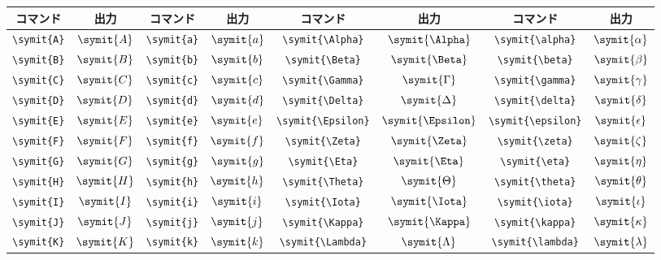 \begin{longtable}{cccccccc}
    \toprule
    コマンド         & 出力          & コマンド         & 出力          & コマンド                & 出力                 & コマンド                   & 出力                    \\
    \midrule
    \verb|\symit{A}| & \(\symit{A}\) & \verb|\symit{a}| & \(\symit{a}\) & \verb|\symit{\Alpha}|   & \(\symit{\Alpha}\)   & \verb|\symit{\alpha}|      & \(\symit{\alpha}\)      \\
    \verb|\symit{B}| & \(\symit{B}\) & \verb|\symit{b}| & \(\symit{b}\) & \verb|\symit{\Beta}|    & \(\symit{\Beta}\)    & \verb|\symit{\beta}|       & \(\symit{\beta}\)       \\
    \verb|\symit{C}| & \(\symit{C}\) & \verb|\symit{c}| & \(\symit{c}\) & \verb|\symit{\Gamma}|   & \(\symit{\Gamma}\)   & \verb|\symit{\gamma}|      & \(\symit{\gamma}\)      \\
    \verb|\symit{D}| & \(\symit{D}\) & \verb|\symit{d}| & \(\symit{d}\) & \verb|\symit{\Delta}|   & \(\symit{\Delta}\)   & \verb|\symit{\delta}|      & \(\symit{\delta}\)      \\
    \verb|\symit{E}| & \(\symit{E}\) & \verb|\symit{e}| & \(\symit{e}\) & \verb|\symit{\Epsilon}| & \(\symit{\Epsilon}\) & \verb|\symit{\epsilon}|    & \(\symit{\epsilon}\)    \\
    \verb|\symit{F}| & \(\symit{F}\) & \verb|\symit{f}| & \(\symit{f}\) & \verb|\symit{\Zeta}|    & \(\symit{\Zeta}\)    & \verb|\symit{\zeta}|       & \(\symit{\zeta}\)       \\
    \verb|\symit{G}| & \(\symit{G}\) & \verb|\symit{g}| & \(\symit{g}\) & \verb|\symit{\Eta}|     & \(\symit{\Eta}\)     & \verb|\symit{\eta}|        & \(\symit{\eta}\)        \\
    \verb|\symit{H}| & \(\symit{H}\) & \verb|\symit{h}| & \(\symit{h}\) & \verb|\symit{\Theta}|   & \(\symit{\Theta}\)   & \verb|\symit{\theta}|      & \(\symit{\theta}\)      \\
    \verb|\symit{I}| & \(\symit{I}\) & \verb|\symit{i}| & \(\symit{i}\) & \verb|\symit{\Iota}|    & \(\symit{\Iota}\)    & \verb|\symit{\iota}|       & \(\symit{\iota}\)       \\
    \verb|\symit{J}| & \(\symit{J}\) & \verb|\symit{j}| & \(\symit{j}\) & \verb|\symit{\Kappa}|   & \(\symit{\Kappa}\)   & \verb|\symit{\kappa}|      & \(\symit{\kappa}\)      \\
    \verb|\symit{K}| & \(\symit{K}\) & \verb|\symit{k}| & \(\symit{k}\) & \verb|\symit{\Lambda}|  & \(\symit{\Lambda}\)  & \verb|\symit{\lambda}|     & \(\symit{\lambda}\)     \\

\end{longtable}
